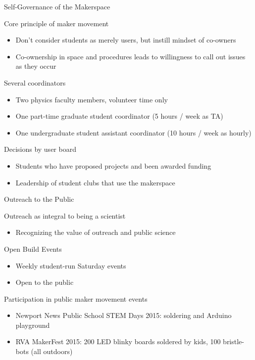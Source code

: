 \documentclass[xcolor=table,compress,professionalfonts,pdfpagelabels]{beamer}
\begin{document}
\begin{frame}{Self-Governance of the Makerspace}
 \begin{block}{Core principle of maker movement}
  \begin{itemize}
   \item Don't consider students as merely users, but instill mindset of co-owners
   \item Co-ownership in space and procedures leads to willingness to call out issues as they occur
  \end{itemize}
 \end{block}
 \begin{block}{Several coordinators}
  \begin{itemize}
   \item Two physics faculty members, volunteer time only
   \item One part-time graduate student coordinator (5 hours / week as TA)
   \item One undergraduate student assistant coordinator (10 hours / week as hourly)
  \end{itemize}
 \end{block}
 \begin{block}{Decisions by user board}
  \begin{itemize}
   \item Students who have proposed projects and been awarded funding
   \item Leadership of student clubs that use the makerspace
  \end{itemize}
 \end{block}
\end{frame}

\begin{frame}{Outreach to the Public}
 \begin{block}{Outreach as integral to being a scientist}
  \begin{itemize}
   \item Recognizing the value of outreach and public science
  \end{itemize}
 \end{block}
 \begin{block}{Open Build Events}
  \begin{itemize}
   \item Weekly student-run Saturday events
   \item Open to the public
  \end{itemize}
 \end{block}
 \begin{block}{Participation in public maker movement events}
  \begin{itemize}
   \item Newport News Public School STEM Days 2015: soldering and Arduino playground
   \item RVA MakerFest 2015: 200 LED blinky boards soldered by kids, 100 bristle-bots (all outdoors)
  \end{itemize}
 \end{block}
\end{frame}
\end{document}
